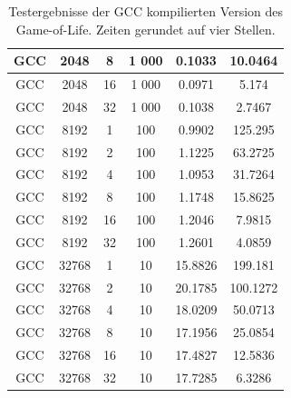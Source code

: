 \documentclass[german,plainarticle,hyperref,utf8]{zihpub}
\begin{document}
\begin{table}[h]
\begin{center}
\begin{tabular}{||c c c c c c||}
				\hline
				GCC      & 2048  & 8         & 1 000       & 0.1033              & 10.0464          \\
				\hline
				GCC      & 2048  & 16        & 1 000       & 0.0971              & 5.174            \\
				\hline
				GCC      & 2048  & 32        & 1 000       & 0.1038              & 2.7467           \\
				\hline\hline
				GCC      & 8192  & 1         & 100         & 0.9902              & 125.295          \\
				\hline
				GCC      & 8192  & 2         & 100         & 1.1225              & 63.2725          \\
				\hline
				GCC      & 8192  & 4         & 100         & 1.0953              & 31.7264          \\
				\hline
				GCC      & 8192  & 8         & 100         & 1.1748              & 15.8625          \\
				\hline
				GCC      & 8192  & 16        & 100         & 1.2046              & 7.9815           \\
				\hline
				GCC      & 8192  & 32        & 100         & 1.2601              & 4.0859           \\
				\hline\hline
				GCC      & 32768 & 1         & 10          & 15.8826             & 199.181          \\
				\hline
				GCC      & 32768 & 2         & 10          & 20.1785             & 100.1272         \\
				\hline
				GCC      & 32768 & 4         & 10          & 18.0209             & 50.0713          \\
				\hline
				GCC      & 32768 & 8         & 10          & 17.1956             & 25.0854          \\
				\hline
				GCC      & 32768 & 16        & 10          & 17.4827             & 12.5836          \\
				\hline
				GCC      & 32768 & 32        & 10          & 17.7285             & 6.3286           \\
				\hline
			\end{tabular}
			\caption{\label{tab:gcc}Testergebnisse der GCC kompilierten Version des Game-of-Life. Zeiten gerundet auf vier Stellen.}
		\end{center}
	\end{table}
\end{document}
